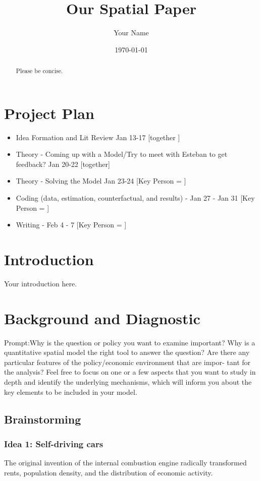 \documentclass{article}
\title{Our Spatial Paper}
\author{Your Name}
\date{\today}
\begin{document}
\maketitle

\begin{abstract}
    Please be concise.
\end{abstract}

\section{Project Plan}
\begin{itemize}
    \item Idea Formation and Lit Review  Jan 13-17  [together ]
    \item Theory - Coming up with a Model/Try to meet with Esteban to get feedback? Jan 20-22 [together]
    \item Theory - Solving the Model Jan 23-24 [Key Person = ]
    \item Coding (data, estimation, counterfactual, and results) - Jan 27 - Jan 31  [Key Person = ]
    \item Writing -  Feb 4 - 7  [Key Person = ]
\end{itemize}

\section{Introduction}
\label{sec:intro}
Your introduction here.

\section{Background and Diagnostic}
Prompt:Why is the question or policy you want to examine
important? Why is a quantitative spatial model the right tool to answer the question?
Are there any particular features of the policy/economic environment that are impor-
tant for the analysis? Feel free to focus on one or a few aspects that you want to study
in depth and identify the underlying mechanisms, which will inform you about the key
elements to be included in your model.
\subsection{Brainstorming }

\subsubsection{Idea 1: Self-driving cars}
The original invention of the internal combustion engine
radically transformed rents, population density, and the distribution of economic activity. 
\end{document}
